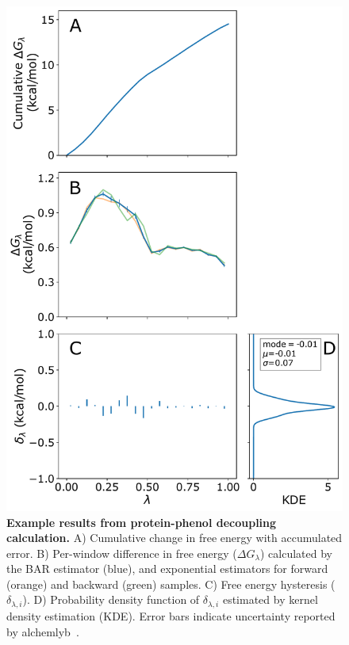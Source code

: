\documentclass[9pt,tutorial,pubversion]{Styling/livecoms}
\begin{document}
\begin{figure}[!h]
    \centering
    \includegraphics[width=1\linewidth]{bound_generalFigures}
    \caption{\textbf{Example results from protein-phenol decoupling calculation.} A) Cumulative change in free energy with accumulated error. B) Per-window difference in free energy ($\Delta G_\lambda$) calculated by the BAR estimator (blue), and exponential estimators for forward (orange) and backward (green) samples. C) Free energy hysteresis ($\delta_{\lambda,i}$). D) Probability density function of $\delta_{\lambda,i}$ estimated by kernel density estimation (KDE). Error bars indicate uncertainty reported by alchemlyb~\cite{shirts2008statistically}.
    }\label{fig:FEPexample}
\end{figure}
\end{document}
